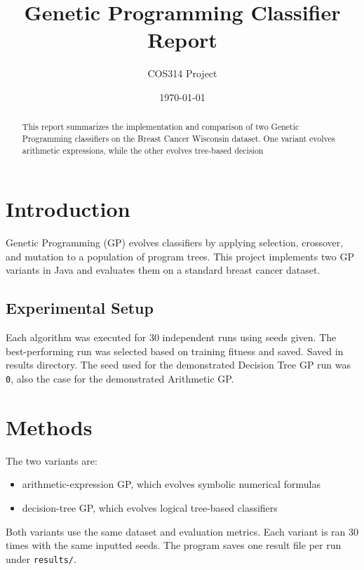 \documentclass{article}
\begin{document}
\title{Genetic Programming Classifier Report}
\author{COS314 Project}
\date{\today}
\maketitle

\begin{abstract}
This report summarizes the implementation and comparison of two Genetic Programming classifiers on the Breast 
Cancer Wisconsin dataset. One variant evolves arithmetic expressions, while the other evolves tree-based decision
\end{abstract}

\section{Introduction}
Genetic Programming (GP) evolves classifiers by applying selection, crossover, and mutation to a 
population of program trees. 
This project implements two GP variants in Java and evaluates them on a 
standard breast cancer dataset.

\subsection{Experimental Setup}
Each algorithm was executed for 30 independent runs using seeds given.
The best-performing run was selected based on training fitness and saved. Saved in results directory. 
The seed used for the demonstrated Decision Tree GP run was \texttt{0}, also the case for the demonstrated Arithmetic GP.

\section{Methods}
The two variants are:
\begin{itemize}
  \item arithmetic-expression GP, which evolves symbolic numerical formulas
  \item decision-tree GP, which evolves logical tree-based classifiers
\end{itemize}
Both variants use the same dataset and evaluation metrics.
Each variant is ran 30 times with the same inputted seeds.
The program saves one result file per run under \texttt{results/}.
\end{document}
